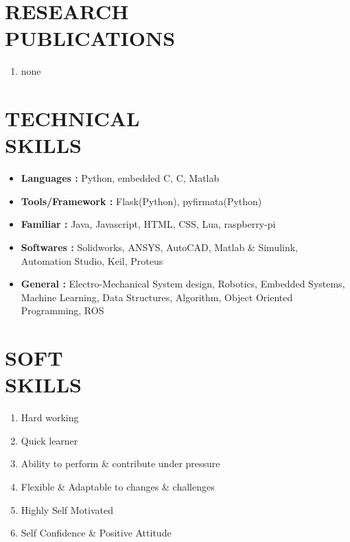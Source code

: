 \documentclass[margin]{res}
\begin{document}
    \section{RESEARCH \\ PUBLICATIONS}
    \begin{enumerate}
        \item none
    \end{enumerate}
  
    \section{TECHNICAL \\ SKILLS}
    \begin{itemize}
    \item \textbf{Languages : } Python, embedded C, C, Matlab 
    \item \textbf{Tools/Framework : } Flask(Python), pyfirmata(Python)
    \item \textbf{Familiar : } Java, Javascript, HTML, CSS, Lua, raspberry-pi  
    \item \textbf{Softwares :} Solidworks, ANSYS, AutoCAD, Matlab \& Simulink, Automation Studio, Keil, Proteus   
    \item \textbf{General : } Electro-Mechanical System design, Robotics, Embedded Systems, Machine Learning, 
                            Data Structures, Algorithm, Object Oriented Programming, ROS \\
    \end{itemize}
  
    \section{SOFT \\ SKILLS}
    \begin{enumerate}   
    \item {Hard working }
    \item {Quick learner }
    \item {Ability to perform \& contribute under pressure}
    \item {Flexible \& Adaptable to changes \& challenges}
    \item {Highly Self Motivated}
    \item {Self Confidence \& Positive Attitude}
    \end{enumerate}
  
\end{document}

